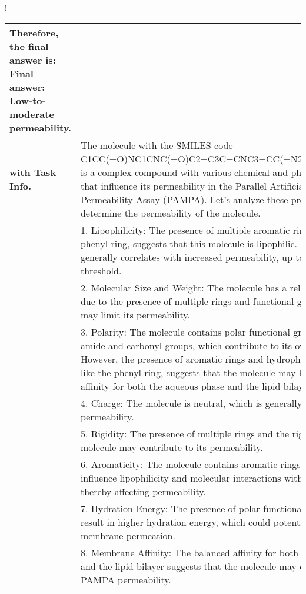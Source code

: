 \begin{table}[ht!]
\begin{resizebox}{\linewidth}{!}
{\begin{tabular}{p{1.2cm} p{18cm}}
Therefore, the final answer is: \textcolor{tabred}{Final answer: Low-to-moderate permeability.} \\



\midrule



\textbf{with Task Info.} & The molecule with the SMILES code C1CC(=O)NC1CNC(=O)C2=C3C=CNC3=CC(=N2)C4=CC=CC=C4 is a complex compound with various chemical and physical properties that influence its permeability in the Parallel Artificial Membrane Permeability Assay (PAMPA). Let's analyze these properties to determine the permeability of the molecule. \\

& 1. Lipophilicity: The presence of multiple aromatic rings, such as the phenyl ring, suggests that this molecule is lipophilic. Lipophilicity generally correlates with increased permeability, up to a certain threshold. \\

& 2. Molecular Size and Weight: The molecule has a relatively large size due to the presence of multiple rings and functional groups. This size may limit its permeability. \\

& 3. Polarity: The molecule contains polar functional groups, such as amide and carbonyl groups, which contribute to its overall polarity. However, the presence of aromatic rings and hydrophobic substituents, like the phenyl ring, suggests that the molecule may have a balanced affinity for both the aqueous phase and the lipid bilayer.  \\

& 4. Charge: The molecule is neutral, which is generally favorable for permeability. \\

& 5. Rigidity: The presence of multiple rings and the rigidity of the molecule may contribute to its permeability. \\

& 6. Aromaticity: The molecule contains aromatic rings, which can influence lipophilicity and molecular interactions with the lipid bilayer, thereby affecting permeability.  \\

& 7. Hydration Energy: The presence of polar functional groups may result in higher hydration energy, which could potentially hinder membrane permeation. \\

& 8. Membrane Affinity: The balanced affinity for both the aqueous phase and the lipid bilayer suggests that the molecule may exhibit better PAMPA permeability. \\


\end{tabular}}
\end{resizebox}
\end{table}
